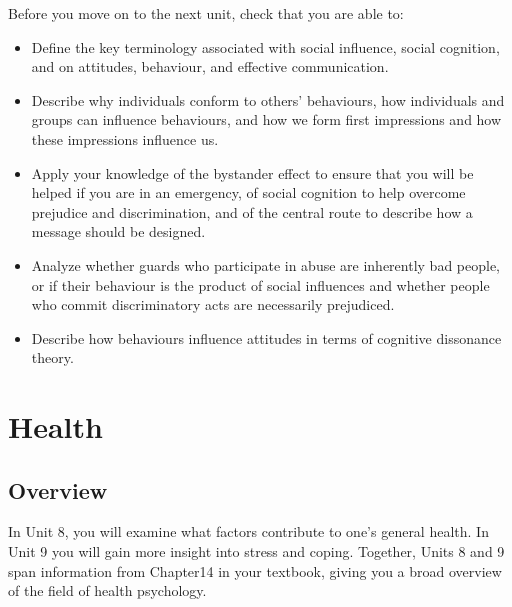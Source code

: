\documentclass[
]{book}
\begin{document}
\begin{progress}
Before you move on to the next unit, check that you are able to:

\begin{itemize}
\item
  Define the key terminology associated with social influence, social cognition, and on attitudes, behaviour, and effective communication.
\item
  Describe why individuals conform to others' behaviours, how individuals and groups can influence behaviours, and how we form first impressions and how these impressions influence us.
\item
  Apply your knowledge of the bystander effect to ensure that you will be helped if you are in an emergency, of social cognition to help overcome prejudice and discrimination, and of the central route to describe how a message should be designed.
\item
  Analyze whether guards who participate in abuse are inherently bad people, or if their behaviour is the product of social influences and whether people who commit discriminatory acts are necessarily prejudiced.
\item
  Describe how behaviours influence attitudes in terms of cognitive dissonance theory.
\end{itemize}
\end{progress}

\hypertarget{health}{%
\chapter{Health}\label{health}}

\hypertarget{overview-6}{%
\section*{Overview}\label{overview-6}}

In Unit 8, you will examine what factors contribute to one's general health. In Unit 9 you will gain more insight into stress and coping. Together, Units 8 and 9 span information from Chapter14 in your textbook, giving you a broad overview of the field of health psychology.
\end{document}
